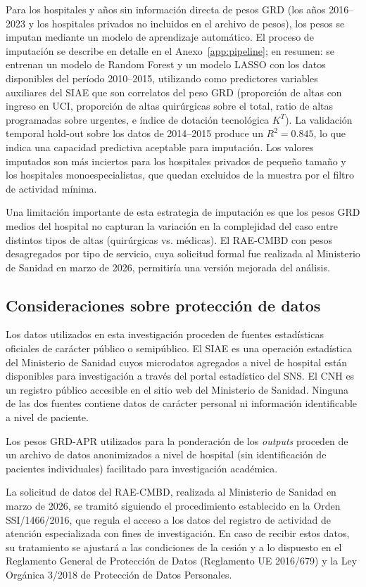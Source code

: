 \documentclass[12pt, a4paper, twoside, openright]{book}
\theoremstyle{plain}
\theoremstyle{definition}
\theoremstyle{remark}
\begin{document}
Para los hospitales y años sin información directa de pesos GRD (los años 2016--2023 y los hospitales privados no incluidos en el archivo de pesos), los pesos se imputan mediante un modelo de aprendizaje automático. El proceso de imputación se describe en detalle en el Anexo~\ref{app:pipeline}; en resumen: se entrenan un modelo de Random Forest y un modelo LASSO con los datos disponibles del período 2010--2015, utilizando como predictores variables auxiliares del SIAE que son correlatos del peso GRD (proporción de altas con ingreso en UCI, proporción de altas quirúrgicas sobre el total, ratio de altas programadas sobre urgentes, e índice de dotación tecnológica $K^T$). La validación temporal hold-out sobre los datos de 2014--2015 produce un $R^2 = 0.845$, lo que indica una capacidad predictiva aceptable para imputación. Los valores imputados son más inciertos para los hospitales privados de pequeño tamaño y los hospitales monoespecialistas, que quedan excluidos de la muestra por el filtro de actividad mínima.

Una limitación importante de esta estrategia de imputación es que los pesos GRD medios del hospital no capturan la variación en la complejidad del caso entre distintos tipos de altas (quirúrgicas vs. médicas). El RAE-CMBD con pesos desagregados por tipo de servicio, cuya solicitud formal fue realizada al Ministerio de Sanidad en marzo de 2026, permitiría una versión mejorada del análisis.

\subsection{Consideraciones sobre protección de datos}

Los datos utilizados en esta investigación proceden de fuentes estadísticas oficiales de carácter público o semipúblico. El SIAE es una operación estadística del Ministerio de Sanidad cuyos microdatos agregados a nivel de hospital están disponibles para investigación a través del portal estadístico del SNS\@. El CNH es un registro público accesible en el sitio web del Ministerio de Sanidad. Ninguna de las dos fuentes contiene datos de carácter personal ni información identificable a nivel de paciente.

Los pesos GRD-APR utilizados para la ponderación de los \textit{outputs} proceden de un archivo de datos anonimizados a nivel de hospital (sin identificación de pacientes individuales) facilitado para investigación académica.

La solicitud de datos del RAE-CMBD, realizada al Ministerio de Sanidad en marzo de 2026, se tramitó siguiendo el procedimiento establecido en la Orden SSI/1466/2016, que regula el acceso a los datos del registro de actividad de atención especializada con fines de investigación. En caso de recibir estos datos, su tratamiento se ajustará a las condiciones de la cesión y a lo dispuesto en el Reglamento General de Protección de Datos (Reglamento UE 2016/679) y la Ley Orgánica 3/2018 de Protección de Datos Personales.
\end{document}
